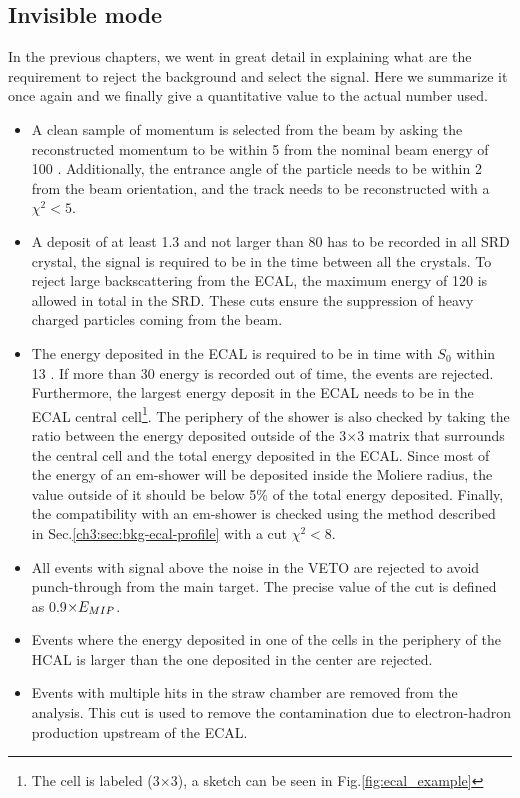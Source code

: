 \subsection{Invisible mode}
\label{ch3:sec:selection-criteria-invis}

In the previous chapters, we went in great detail in explaining what are the requirement to reject the background and select the signal. Here we summarize it once again and we finally give a quantitative value to the actual number used.

\begin{itemize}
\item A clean sample of momentum is selected from the beam by asking the reconstructed momentum to be within 5 \gev from the nominal beam energy of 100 \gev. Additionally, the entrance angle of the particle needs to be within 2 \mrad from the beam orientation, and the track needs to be reconstructed with a $\chi^2<5$.
\item A deposit of at least 1.3 \mev and not larger than 80 \mev has to be recorded in all SRD crystal, the signal is required to be in the time between all the crystals. To reject large backscattering from the ECAL, the maximum energy of 120 \mev is allowed in total in the SRD. These cuts ensure the suppression of heavy charged particles coming from the beam.
\item The energy deposited in the ECAL is required to be in time with $S_0$ within 13 \nas. If more than 30 \gev energy is recorded out of time, the events are rejected. Furthermore, the largest energy deposit in the ECAL needs to be in the ECAL central cell\footnote{The cell is labeled (3$\times$3), a sketch can be seen in Fig.\ref{fig:ecal_example}}. The periphery of the shower is also checked by taking the ratio between the energy deposited outside of the 3$\times$3 matrix that surrounds the central cell and the total energy deposited in the ECAL. Since most of the energy of an em-shower will be deposited inside the Moliere radius, the value outside of it should be below 5\% of the total energy deposited. Finally, the compatibility with an em-shower is checked using the method described in Sec.\ref{ch3:sec:bkg-ecal-profile} with a cut $\chi^2 < 8$.
\item All events with signal above the noise in the VETO are rejected to avoid punch-through from the main target. The precise value of the cut is defined as 0.9$\times E_{MIP}$.
\item Events where the energy deposited in one of the cells in the periphery of the HCAL is larger than the one deposited in the center are rejected.
\item Events with multiple hits in the straw chamber are removed from the analysis. This cut is used to remove the contamination due to electron-hadron production upstream of the ECAL.
\end{itemize}

